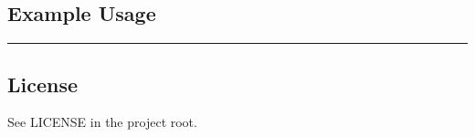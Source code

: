 \subsection{Example Usage}\label{example-usage}

\begin{Shaded}
\begin{Highlighting}[]

\end{Highlighting}
\end{Shaded}

\begin{center}\rule{0.5\linewidth}{0.5pt}\end{center}

\subsection{License}\label{license}

See LICENSE in the project root.
